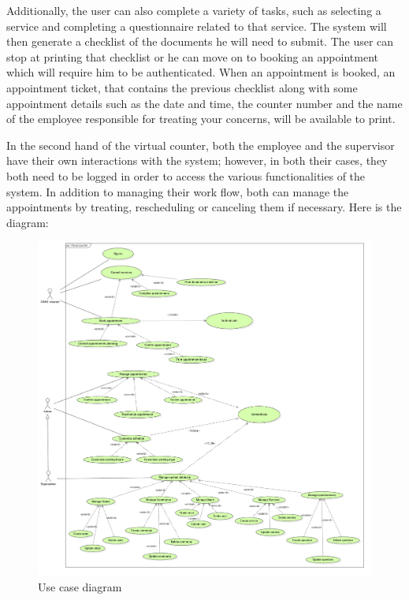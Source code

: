  Additionally, the user can also complete a variety of tasks, such as selecting a service and completing a questionnaire related to that service. The system will then generate a checklist of the documents he will need to submit. The user can stop at printing that checklist or he can move on to booking an appointment which will require him to be authenticated. When an appointment is booked, an appointment ticket, that contains the previous checklist along with some appointment details such as the date and time, the counter number and the name of the employee responsible for treating your concerns,  will be available to print. 
 
 \medskip In the second hand of the virtual counter, both the employee and the supervisor have their own interactions with the system; however, in both their cases, they both need to be logged in order to access the various functionalities of the system. In addition to managing their work flow, both can manage the appointments by treating, rescheduling or canceling them if necessary. 
\newpage
 \medskip Here is the diagram:

 \begin{figure}[H]
    \centering
    \includegraphics[width=1.0\textwidth]{UseCase.PNG}
    \caption{Use case diagram}
    \label{ucdiagram}
 \end{figure}
 \newpage
